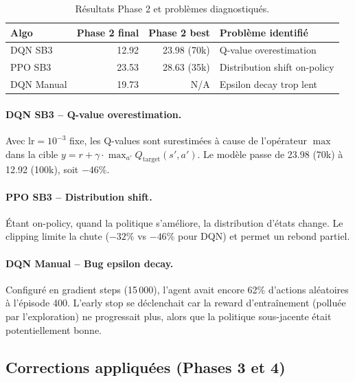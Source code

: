 \documentclass[11pt, a4paper]{article}
\begin{document}
\begin{table}[H]
\centering
\begin{tabular}{l rrl}
\toprule
\textbf{Algo} & \textbf{Phase 2 final} & \textbf{Phase 2 best} & \textbf{Problème identifié}\\
\midrule
DQN SB3     & 12.92 & 23.98 (70k) & Q-value overestimation\\
PPO SB3     & 23.53 & 28.63 (35k) & Distribution shift on-policy\\
DQN Manual  & 19.73 & N/A         & Epsilon decay trop lent\\
\bottomrule
\end{tabular}
\caption{Résultats Phase 2 et problèmes diagnostiqués.}
\end{table}

\paragraph{DQN SB3 -- Q-value overestimation.}
Avec $\text{lr}=10^{-3}$ fixe, les Q-values sont surestimées à cause de l'opérateur $\max$ dans la cible $y = r + \gamma \cdot \max_{a'} Q_{\text{target}}(s', a')$. Le modèle passe de 23.98 (70k) à 12.92 (100k), soit $-46\%$.

\paragraph{PPO SB3 -- Distribution shift.}
Étant on-policy, quand la politique s'améliore, la distribution d'états change. Le clipping limite la chute ($-32\%$ vs $-46\%$ pour DQN) et permet un rebond partiel.

\paragraph{DQN Manual -- Bug epsilon decay.}
Configuré en gradient steps (15\,000), l'agent avait encore 62\% d'actions aléatoires à l'épisode 400. L'early stop se déclenchait car la reward d'entraînement (polluée par l'exploration) ne progressait plus, alors que la politique sous-jacente était potentiellement bonne.

\subsection{Corrections appliquées (Phases 3 et 4)}
\end{document}
